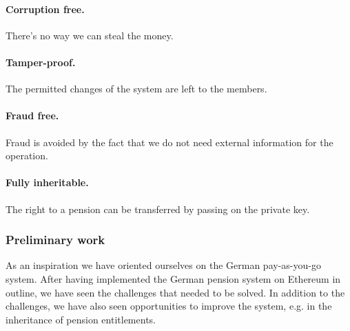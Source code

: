 \paragraph{Corruption free.} There's no way we can steal the money.

\paragraph{Tamper-proof.} The permitted changes of the system are left to the members.

\paragraph{Fraud free.}
Fraud is avoided by the fact that we do not need external information for the operation. 

\paragraph{Fully inheritable.}
The right to a pension can be transferred by passing on the private key.


\subsubsection{Preliminary work}

As an inspiration we have oriented ourselves on the German pay-as-you-go system. After having implemented the German pension system on Ethereum in outline, we have seen the challenges that needed to be solved.
In addition to the challenges, we have also seen opportunities to improve the system, e.g. in the inheritance of pension entitlements.
